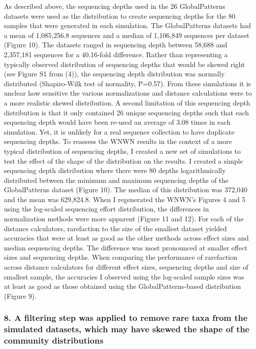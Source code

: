 \documentclass[
]{article}
\begin{document}
As described above, the sequencing depths used in the 26 GlobalPatterns
datasets were used as the distribution to create sequencing depths for
the 80 samples that were generated in each simulation. The
GlobalPatterns datasets had a mean of 1,085,256.8 sequences and a median
of 1,106,849 sequences per dataset (Figure 10). The datasets ranged in
sequencing depth between 58,688 and 2,357,181 sequences for a 40.16-fold
difference. Rather than representing a typically observed distribution
of sequencing depths that would be skewed right (see Figure S1 from
(4)), the sequencing depth distribution was normally distributed
(Shapiro-Wilk test of normality, P=0.57). From these simulations it is
unclear how sensitive the various normalizations and distance
calculations were to a more realistic skewed distribution. A second
limitation of this sequencing depth distribution is that it only
contained 26 unique sequencing depths such that each sequencing depth
would have been re-used an average of 3.08 times in each simulation.
Yet, it is unlikely for a real sequence collection to have duplicate
sequencing depths. To reassess the WNWN results in the context of a more
typical distribution of sequencing depths, I created a new set of
simulations to test the effect of the shape of the distribution on the
results. I created a simple sequencing depth distribution where there
were 80 depths logarithmically distributed between the minimum and
maximum sequencing depths of the GlobalPatterns dataset (Figure 10). The
median of this distribution was 372,040 and the mean was 629,824.8. When
I regenerated the WNWN's Figures 4 and 5 using the log-scaled sequencing
effort distribution, the differences in normalization methods were more
apparent (Figure 11 and 12). For each of the distance calculators,
rarefaction to the size of the smallest dataset yielded accuracies that
were at least as good as the other methods across effect sizes and
median sequencing depths. The difference was most pronounced at smaller
effect sizes and sequencing depths. When comparing the performance of
rarefaction across distance calculators for different effect sizes,
sequencing depths and size of smallest sample, the accuracies I observed
using the log-scaled sample sizes was at least as good as those obtained
using the GlobalPatterns-based distribution (Figure 9).

\hypertarget{a-filtering-step-was-applied-to-remove-rare-taxa-from-the-simulated-datasets-which-may-have-skewed-the-shape-of-the-community-distributions}{%
\subsubsection{8. A filtering step was applied to remove rare taxa from
the simulated datasets, which may have skewed the shape of the community
distributions}\label{a-filtering-step-was-applied-to-remove-rare-taxa-from-the-simulated-datasets-which-may-have-skewed-the-shape-of-the-community-distributions}}
\end{document}
